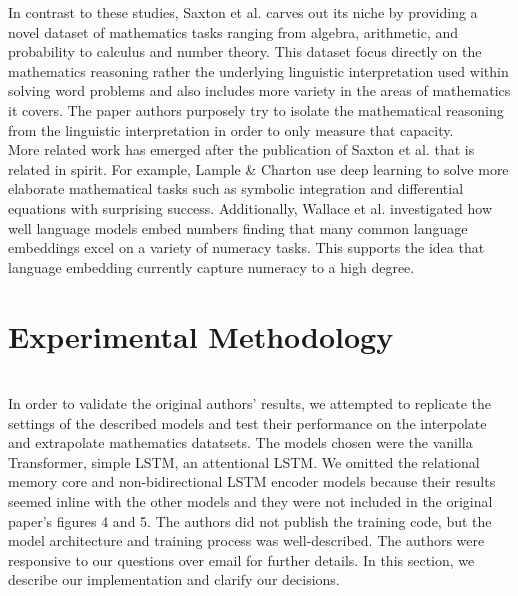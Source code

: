 In contrast to these studies, Saxton et al. \supercite{DBLP:journals/corr/abs-1904-01557} carves out its niche by providing a novel dataset of mathematics tasks ranging from algebra, arithmetic, and probability to calculus and number theory. This dataset focus directly on the mathematics reasoning rather the underlying linguistic interpretation used within solving word problems and also includes more variety in the areas of mathematics it covers. The paper authors purposely try to isolate the mathematical reasoning from the linguistic interpretation in order to only measure that capacity. \\

More related work has emerged after the publication of Saxton et al.\supercite{DBLP:journals/corr/abs-1904-01557} that is related in spirit. For example, Lample \& Charton \supercite{lample2019deep} use deep learning to solve more elaborate mathematical tasks such as symbolic integration and differential equations with surprising success.  Additionally, Wallace et al. \supercite{wallace2019nlp} investigated how well language models embed numbers finding that many common language embeddings excel on a variety of numeracy tasks. This supports the idea that language embedding currently capture numeracy to a high degree. \\


\section{Experimental Methodology} \\
In order to validate the original authors’ results, we attempted to replicate the settings of the described models and test their performance on the interpolate and extrapolate mathematics datatsets. The models chosen were the vanilla Transformer\supercite{vaswani2017attention}, simple LSTM, an attentional LSTM. We omitted the relational memory core and non-bidirectional LSTM encoder models because their results seemed inline with the other models and they were not included in the original paper’s figures 4 and 5. The authors did not publish the training code, but the model architecture and training process was well-described. The authors were responsive to our questions over email for further details. In this section, we describe our implementation and clarify our decisions. 

